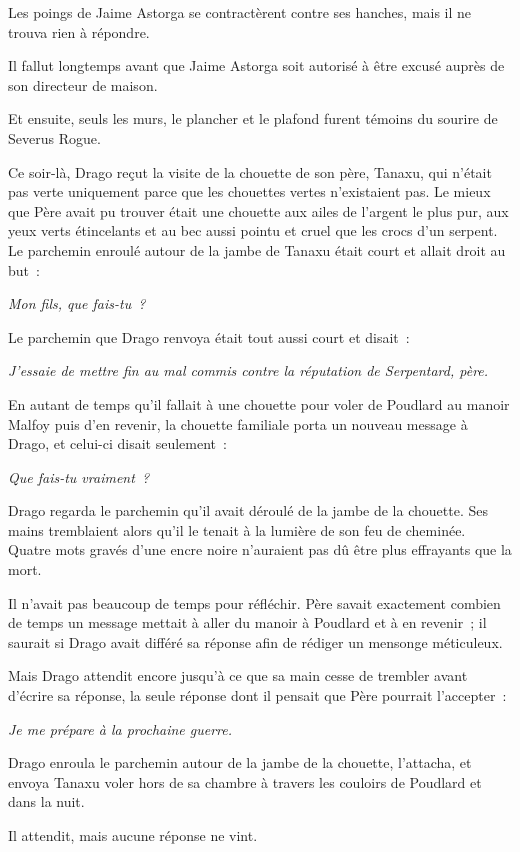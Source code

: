 Les poings de Jaime Astorga se contractèrent contre ses hanches, mais il ne trouva rien à répondre.

Il fallut longtemps avant que Jaime Astorga soit autorisé à être excusé auprès de son directeur de maison.

Et ensuite, seuls les murs, le plancher et le plafond furent témoins du sourire de Severus Rogue.

\later

Ce soir-là, Drago reçut la visite de la chouette de son père, Tanaxu, qui n'était pas verte uniquement parce que les chouettes vertes n'existaient pas. Le mieux que Père avait pu trouver était une chouette aux ailes de l'argent le plus pur, aux yeux verts étincelants et au bec aussi pointu et cruel que les crocs d'un serpent. Le parchemin enroulé autour de la jambe de Tanaxu était court et allait droit au but~:

\emph{Mon fils, que fais-tu~?}

Le parchemin que Drago renvoya était tout aussi court et disait~:

\emph{J'essaie de mettre fin au mal commis contre la réputation de Serpentard, père.}

En autant de temps qu'il fallait à une chouette pour voler de Poudlard au manoir Malfoy puis d'en revenir, la chouette familiale porta un nouveau message à Drago, et celui-ci disait seulement~:

\emph{Que fais-tu vraiment~?}

Drago regarda le parchemin qu'il avait déroulé de la jambe de la chouette. Ses mains tremblaient alors qu'il le tenait à la lumière de son feu de cheminée. Quatre mots gravés d'une encre noire n'auraient pas dû être plus effrayants que la mort.

Il n'avait pas beaucoup de temps pour réfléchir. Père savait exactement combien de temps un message mettait à aller du manoir à Poudlard et à en revenir~; il saurait si Drago avait différé sa réponse afin de rédiger un mensonge méticuleux.

Mais Drago attendit encore jusqu'à ce que sa main cesse de trembler avant d'écrire sa réponse, la seule réponse dont il pensait que Père pourrait l'accepter~:

\emph{Je me prépare à la prochaine guerre.}

Drago enroula le parchemin autour de la jambe de la chouette, l'attacha, et envoya Tanaxu voler hors de sa chambre à travers les couloirs de Poudlard et dans la nuit.

Il attendit, mais aucune réponse ne vint.

